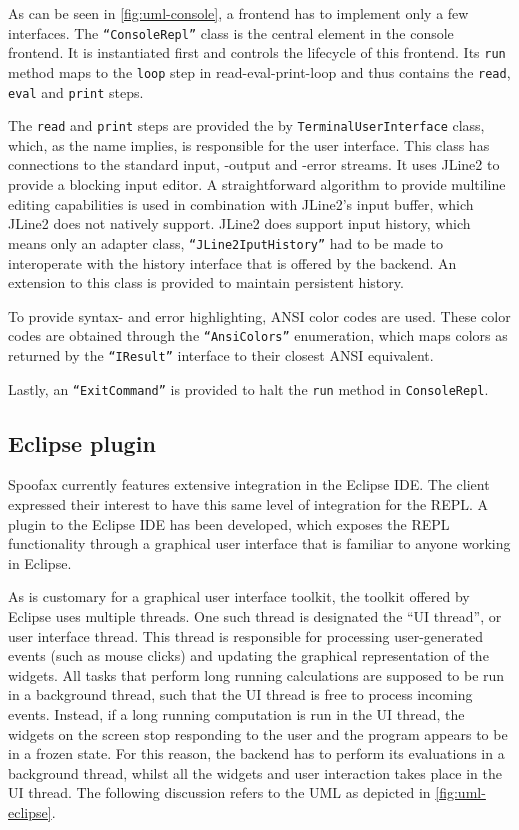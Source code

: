 As can be seen in \cref{fig:uml-console}, a frontend has to implement only a few
interfaces. The \texttt{``ConsoleRepl''} class is the central element in the
console frontend. It is instantiated first and controls the lifecycle of this
frontend. Its \texttt{run} method maps to the \texttt{loop} step in
read-eval-print-loop and thus contains the \texttt{read}, \texttt{eval} and
\texttt{print} steps.

The \texttt{read} and \texttt{print} steps are provided
the by \texttt{TerminalUserInterface} class, which, as the name implies, is
responsible for the user interface. This class has connections to the standard
input, -output and -error streams. It uses JLine2 to provide a blocking input
editor. A straightforward algorithm to provide multiline
editing capabilities is used in combination with JLine2's input buffer, which
JLine2 does not natively support. JLine2 does support input
history, which means only an adapter class, \texttt{``JLine2IputHistory''} had
to be made to interoperate with the history interface that is offered by the
backend. An extension to this class is provided to maintain persistent history.

To provide syntax- and error highlighting, ANSI color codes are used. These
color codes are obtained through the \texttt{``AnsiColors''} enumeration, which
maps colors as returned by the \texttt{``IResult''} interface to their closest
ANSI equivalent.

Lastly, an \texttt{``ExitCommand''} is provided to halt the \texttt{run} method
in \texttt{ConsoleRepl}.

\subsection{Eclipse plugin}
\label{ssec:eclipse-plugin}

Spoofax currently features extensive integration in the Eclipse IDE. The client
expressed their interest to have this same level of integration for the REPL. A
plugin to the Eclipse IDE has been developed, which exposes the REPL
functionality through a graphical user interface that is familiar to anyone
working in Eclipse.

As is customary for a graphical user interface toolkit, the toolkit offered by
Eclipse uses multiple threads. One such thread is designated the ``UI thread'',
or user interface thread. This thread is responsible for processing
user-generated events (such as mouse clicks) and updating the graphical
representation of the widgets. All tasks that perform long running
calculations are supposed to be run in a background thread, such that the UI
thread is free to process incoming events. Instead, if a long running
computation is run in the UI thread, the widgets on the screen stop responding
to the user and the program appears to be in a frozen state. For this reason,
the backend has to perform its evaluations in a background thread, whilst all
the widgets and user interaction takes place in the UI thread.
The following discussion refers to the UML as depicted in
\cref{fig:uml-eclipse}.

